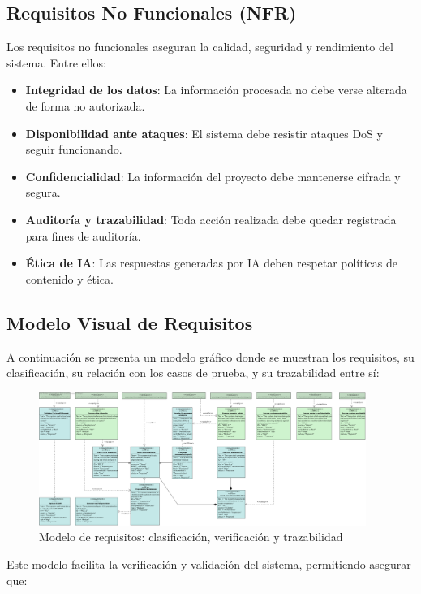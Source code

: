 \documentclass[11pt]{article}
\begin{document}
\subsection{Requisitos No Funcionales (NFR)}

Los requisitos no funcionales aseguran la calidad, seguridad y rendimiento del sistema. Entre ellos:

\begin{itemize}
    \item \textbf{Integridad de los datos}: La información procesada no debe verse alterada de forma no autorizada.
    \item \textbf{Disponibilidad ante ataques}: El sistema debe resistir ataques DoS y seguir funcionando.
    \item \textbf{Confidencialidad}: La información del proyecto debe mantenerse cifrada y segura.
    \item \textbf{Auditoría y trazabilidad}: Toda acción realizada debe quedar registrada para fines de auditoría.
    \item \textbf{Ética de IA}: Las respuestas generadas por IA deben respetar políticas de contenido y ética.
\end{itemize}

\subsection{Modelo Visual de Requisitos}

A continuación se presenta un modelo gráfico donde se muestran los requisitos, su clasificación, su relación con los casos de prueba, y su trazabilidad entre sí:

\begin{figure}[H]
    \centering
    \includegraphics[width=0.95\textwidth]{images/Requirement_Diagram_Group.png}
    \caption{Modelo de requisitos: clasificación, verificación y trazabilidad}
\end{figure}

Este modelo facilita la verificación y validación del sistema, permitiendo asegurar que:
\end{document}
